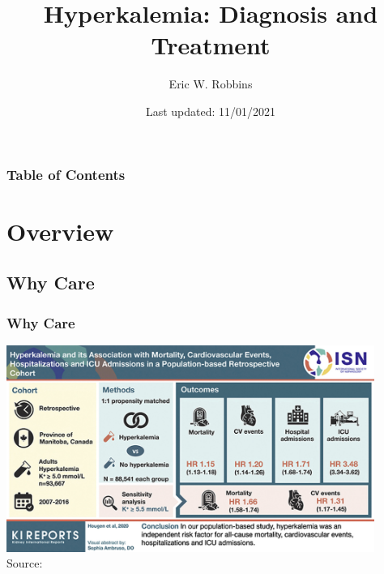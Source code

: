 \documentclass{beamer}
\title{Hyperkalemia: Diagnosis and Treatment}
\author{Eric W. Robbins}
\date{Last updated: 11/01/2021}
\begin{document}
	\begin{frame}
		\maketitle
	\end{frame}
	\begin{frame}
		\frametitle{Table of Contents}
		\tableofcontents
	\end{frame}
\section{Overview}
\subsection{Why Care}
\begin{frame}
\frametitle{Why Care}
\centering
\includegraphics[width=0.90\textwidth,keepaspectratio]{media/danger.jpg}
\\
\tiny{Source:}
\end{frame}
\end{document}
